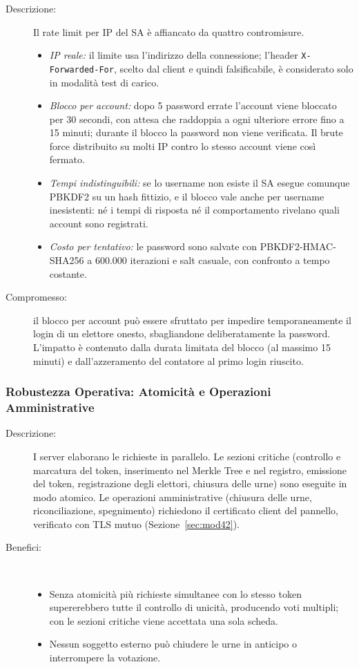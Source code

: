 \documentclass[12pt,a4paper]{article}
\begin{document}
\begin{description}
  \item[Descrizione:] Il rate limit per IP del SA è affiancato da quattro contromisure.
    \begin{itemize}
      \item \textit{IP reale:} il limite usa l'indirizzo della connessione; l'header \texttt{X-Forwarded-}\allowbreak\texttt{For}, scelto dal client e quindi falsificabile, è considerato solo in modalità test di carico.
      \item \textit{Blocco per account:} dopo 5 password errate l'account viene bloccato per 30 secondi, con attesa che raddoppia a ogni ulteriore errore fino a 15 minuti; durante il blocco la password non viene verificata. Il brute force distribuito su molti IP contro lo stesso account viene così fermato.
      \item \textit{Tempi indistinguibili:} se lo username non esiste il SA esegue comunque PBKDF2 su un hash fittizio, e il blocco vale anche per username inesistenti: né i tempi di risposta né il comportamento rivelano quali account sono registrati.
      \item \textit{Costo per tentativo:} le password sono salvate con PBKDF2-HMAC-SHA256 a 600.000 iterazioni e salt casuale, con confronto a tempo costante.
    \end{itemize}
  \item[Compromesso:] il blocco per account può essere sfruttato per impedire temporaneamente il login di un elettore onesto, sbagliandone deliberatamente la password. L'impatto è contenuto dalla durata limitata del blocco (al massimo 15 minuti) e dall'azzeramento del contatore al primo login riuscito.
\end{description}

\subsubsection{Robustezza Operativa: Atomicità e Operazioni Amministrative}
\label{sec:mod41}

\begin{description}
  \item[Descrizione:] I server elaborano le richieste in parallelo. Le sezioni critiche (controllo e marcatura del token, inserimento nel Merkle Tree e nel registro, emissione del token, registrazione degli elettori, chiusura delle urne) sono eseguite in modo atomico. Le operazioni amministrative (chiusura delle urne, riconciliazione, spegnimento) richiedono il certificato client del pannello, verificato con TLS mutuo (Sezione~\ref{sec:mod42}).
  \item[Benefici:] \
    \begin{itemize}
      \item Senza atomicità più richieste simultanee con lo stesso token supererebbero tutte il controllo di unicità, producendo voti multipli; con le sezioni critiche viene accettata una sola scheda.
      \item Nessun soggetto esterno può chiudere le urne in anticipo o interrompere la votazione.
    \end{itemize}
\end{description}
\end{document}
